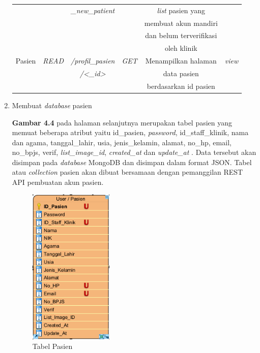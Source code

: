 \begin{enumerate}
\begin{table}[H]
\begin{tabular}{|c|c|c|c|c|c|}
			& 
			&
			\emph{\_new\_patient}&
			&
			\emph{list} pasien yang &\\
			
			& 
			&
			&
			&
			membuat akun mandiri&\\
			
			
			& 
			&
			&
			&
			dan belum terverifikasi&\\
			
			& 
			&
			&
			&
			oleh klinik&\\
			\hline
			
			Pasien& 
			\emph{READ} &
			\emph{/profil\_pasien}&
			\emph{GET} &
			Menampilkan halaman &
			\emph{view}\\
			
			& 
			&
			\emph{/<\_id>}&
			&
			data pasien&\\
			
			& 
			&
			&
			&
			berdasarkan id pasien&\\
			\hline
			
		\end{tabular}
	\end{table}
	
	\item Membuat \emph{database} pasien
	
	\textbf{Gambar 4.4} pada halaman selanjutnya merupakan tabel pasien yang memuat beberapa atribut yaitu id\_pasien, \emph{password}, id\_staff\_klinik, nama dan agama, tanggal\_lahir, usia, jenis\_kelamin, alamat, no\_hp, email, no\_bpjs, verif, \emph{list\_image\_id}, \emph{created\_at} dan \emph{update\_at} . Data tersebut akan disimpan pada \emph{database} MongoDB dan disimpan dalam format JSON. Tabel atau \emph{collection} pasien akan dibuat bersamaan dengan pemanggilan REST API pembuatan akun pasien.
	
	\begin{figure}[H]
		\centering
		\includegraphics[width=4cm]{gambar/database_pasien.png}
		\caption{Tabel Pasien}
		\label{Gambar:pembuatanakunpasien}
	\end{figure}
	

\end{enumerate}
